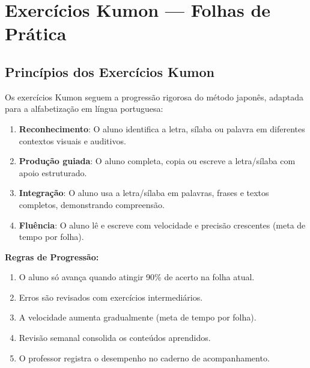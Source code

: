 
\chapter{Exercícios Kumon --- Folhas de Prática}

\section{Princípios dos Exercícios Kumon}

Os exercícios Kumon seguem a progressão rigorosa do método japonês, adaptada
para a alfabetização em língua portuguesa:

\begin{enumerate}[leftmargin=2cm]
  \item \textbf{Reconhecimento}: O aluno identifica a letra, sílaba ou
        palavra em diferentes contextos visuais e auditivos.
  \item \textbf{Produção guiada}: O aluno completa, copia ou escreve a
        letra/sílaba com apoio estruturado.
  \item \textbf{Integração}: O aluno usa a letra/sílaba em palavras,
        frases e textos completos, demonstrando compreensão.
  \item \textbf{Fluência}: O aluno lê e escreve com velocidade e precisão
        crescentes (meta de tempo por folha).
\end{enumerate}

\textbf{Regras de Progressão:}
\begin{enumerate}[leftmargin=2cm]
  \item O aluno só avança quando atingir 90\% de acerto na folha atual.
  \item Erros são revisados com exercícios intermediários.
  \item A velocidade aumenta gradualmente (meta de tempo por folha).
  \item Revisão semanal consolida os conteúdos aprendidos.
  \item O professor registra o desempenho no caderno de acompanhamento.
\end{enumerate}

